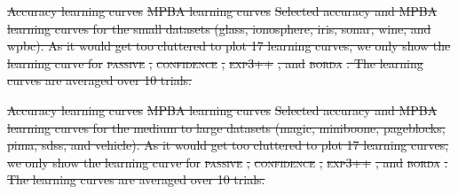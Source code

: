 \documentclass[fleqn,10pt,lineno]{wlpeerj} %
\providecommand{\DIFdeltex}[1]{{\protect\color{red}\sout{#1}}}                      %
\providecommand{\DIFdelFL}[1]{\DIFdel{#1}} %
\providecommand{\DIFdel}[1]{\texorpdfstring{\DIFdeltex{#1}}{}} %
\begin{document}
{%
\DIFdelFL{Accuracy learning curves}}
{%
\DIFdelFL{MPBA learning curves}}
{%
\DIFdelFL{Selected accuracy and MPBA learning
	curves for the small datasets (glass, ionosphere, iris, sonar, wine, and
	wpbc). As it would get too cluttered to plot 17 learning curves, we only
	show the learning curve for }\textsc{\DIFdelFL{passive}}%
\DIFdelFL{, }\textsc{\DIFdelFL{confidence}}%
\DIFdelFL{,
	}\textsc{\DIFdelFL{exp3++}}%
\DIFdelFL{, and }\textsc{\DIFdelFL{borda}}%
\DIFdelFL{. The learning curves are averaged over
	10 trials.}}

{%
\DIFdelFL{Accuracy learning curves}}
{%
\DIFdelFL{MPBA learning curves}}
{%
\DIFdelFL{Selected accuracy and MPBA learning
	curves for the medium to large datasets (magic, miniboone, pageblocks,
	pima, sdss, and vehicle). As it would get too cluttered to plot 17 learning
	curves, we only show the learning curve for }\textsc{\DIFdelFL{passive}}%
\DIFdelFL{,
	}\textsc{\DIFdelFL{confidence}}%
\DIFdelFL{, }\textsc{\DIFdelFL{exp3++}}%
\DIFdelFL{, and }\textsc{\DIFdelFL{borda}}%
\DIFdelFL{. The learning
	curves are averaged over 10 trials.}}
\end{document}
